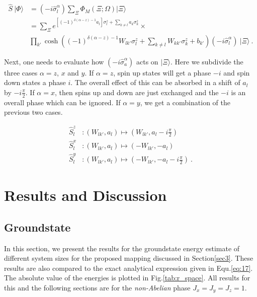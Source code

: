 \documentclass{article}
\begin{document}
\begin{equation}\label{eq:29_1}
	\begin{aligned}
		\hat{S}~|\Phi\rangle &= (-i\hat{\sigma}^{\alpha}_l)\sum_{\Xi}\Phi_{M}(\Xi;\Omega)|\Xi\rangle\\
		&= \sum_{\Xi} e^{[(-1)^{\delta(\alpha-z)-1} a_l]\sigma^{z}_l + \sum_{k\neq l} a_k \sigma_k^z} \times \\ &\prod_{k'} \cosh \left((-1)^{\delta(\alpha-z)-1} W_{lk'} \sigma_l^z + \sum_{k\neq l} W_{kk'} \sigma_k^z + b_{k'} \right) (-i\hat{\sigma}^{\alpha}_l)~|\Xi\rangle~.
	\end{aligned}
\end{equation}

Next, one needs to evaluate how $(-i \hat{\sigma}^{\alpha}_a)$ acts on $|\Xi\rangle$. Here we subdivide the three cases $\alpha =z$, $x$ and $y$. If $\alpha =z$, spin up states will get a phase $-i$ and spin down states a phase $i$. The overall effect of this can be absorbed in a shift of $a_l$ by $-i \frac{\pi}{2}$. If $\alpha=x$, then spins up and down are just exchanged and the $-i$ is an overall phase which can be ignored. If $\alpha = y$, we get a combination of the previous two cases. 

\begin{equation}\label{eq:29_2}
	\begin{aligned}
		\hat{S}^z_l & : \left(W_{lk'},a_l\right) \mapsto \left(W_{lk'},a_l- i \frac{\pi}{2}\right) \\	
    	\hat{S}^x_l & : \left(W_{lk'},a_l\right) \mapsto \left(-W_{lk'},-a_l\right) \\
    	\hat{S}^y_l & : \left(W_{lk'},a_l\right) \mapsto \left(-W_{lk'},-a_l-i \frac{\pi}{2}\right)~.
	\end{aligned}
\end{equation}

\section{Results and Discussion}\label{sec5}

\subsection{Groundstate}

In this section, we present the results for the groundstate energy estimate of different system sizes for the proposed mapping discussed in Section\hspace{0.2mm}\ref{sec3}. These results are also compared to the exact analytical expression given in Equ.\hspace{0.2mm}\ref{eq:17}. The absolute value of the energies is plotted in Fig.\hspace{0.2mm}\ref{tab:r_space}. All results for this and the following sections are for the \textit{non-Abelian} phase $J_x = J_y = J_z = 1$.
\end{document}
